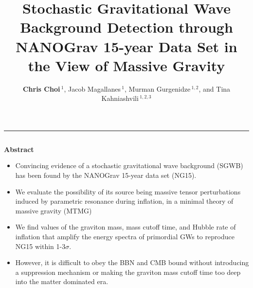 \documentclass{beamer}                             %
\title[]{\Huge Stochastic Gravitational Wave Background Detection through \\ NANOGrav 15-year Data Set in the View of Massive Gravity}
\author[Choi]{\LARGE \textbf{Chris Choi$\,^1$}, Jacob Magallanes$\,^1$, Murman Gurgenidze$\,^{1,2}$, and Tina Kahniashvili$\,^{1,2,3}$}
\institute[]{\large $\,^1$Carnegie Mellon University, $\,^2$Ilia State University, $\,^3$Abastumani Astrophysical Observatory}
\date[]{}
\newcommand{\blocktitle}[1]{{\Large \textbf{#1}}}
\begin{document}
\begin{frame}[t]
\vspace{-1em}
\titlepage



\vspace{-6cm}

\begin{center}
  \textcolor{darksilver}{\rule{\textwidth}{2mm}}
\end{center}

\begin{columns}[T]


\begin{column}{0.30\textwidth}
  \begin{tcolorbox}
    \blocktitle{Abstract}
    \begin{itemize}
        \item Convincing evidence of a stochastic gravitational wave background (SGWB) has been found by the NANOGrav 15-year data set (NG15). 
        \item We evaluate the possibility of its source being massive tensor perturbations induced by parametric resonance during inflation, in a minimal theory of massive gravity (MTMG)
        \item We find values of the graviton mass, mass cutoff time, and Hubble rate of inflation that amplify the energy spectra of primordial GWs to reproduce NG15 within 1-3$\sigma$. 
        \item However, it is difficult to obey the BBN and CMB bound without introducing a suppression mechanism or making the graviton mass cutoff time too deep into the matter dominated era.
    \end{itemize}
  \end{tcolorbox}


\end{column}
\end{columns}
\end{frame}
\end{document}
